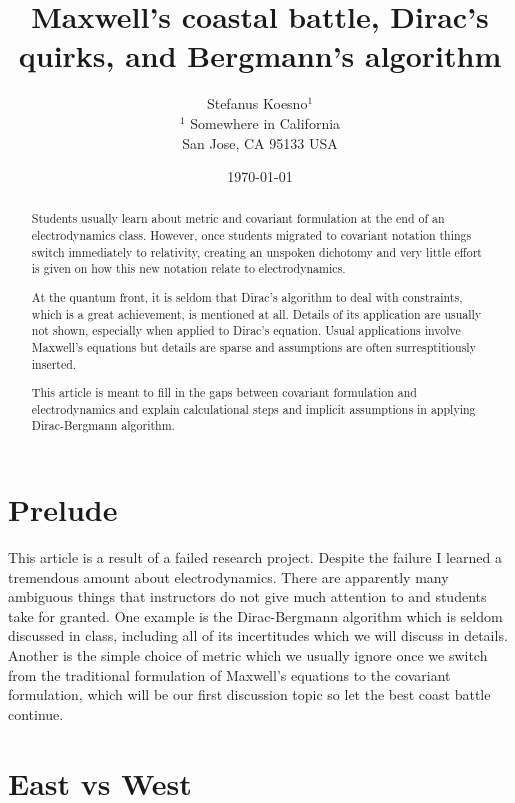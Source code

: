 \documentclass[aps,preprint,preprintnumbers,nofootinbib,showpacs,prd]{revtex4-1}
\begin{document}
\title{Maxwell's coastal battle, Dirac's quirks, and Bergmann's algorithm}
\bigskip
\author{Stefanus Koesno$^1$\\
$^1$ Somewhere in California\\ San Jose, CA 95133 USA\\
}
%
\date{\today}
%
\begin{abstract}
Students usually learn about metric and covariant formulation at the end of an electrodynamics class. However, once students migrated to covariant notation things switch immediately to relativity, creating an unspoken dichotomy and very little effort is given on how this new notation relate to electrodynamics.

At the quantum front, it is seldom that Dirac's algorithm to deal with constraints, which is a great achievement, is mentioned at all. Details of its application are usually not shown, especially when applied to Dirac's equation. Usual applications involve Maxwell's equations but details are sparse and assumptions are often surresptitiously inserted. 

This article is meant to fill in the gaps between covariant formulation and electrodynamics and explain calculational steps and implicit assumptions in applying Dirac-Bergmann algorithm.

\end{abstract}
%
\maketitle

\section{Prelude}

This article is a result of a failed research project. Despite the failure I learned a tremendous amount about electrodynamics. There are apparently many ambiguous things that instructors do not give much attention to and students take for granted. One example is the Dirac-Bergmann algorithm which is seldom discussed in class, including all of its incertitudes which we will discuss in details. Another is the simple choice of metric which we usually ignore once we switch from the traditional formulation of Maxwell's equations to the covariant formulation, which will be our first discussion topic so let the best coast battle continue.

\section{East vs West}
\end{document}
